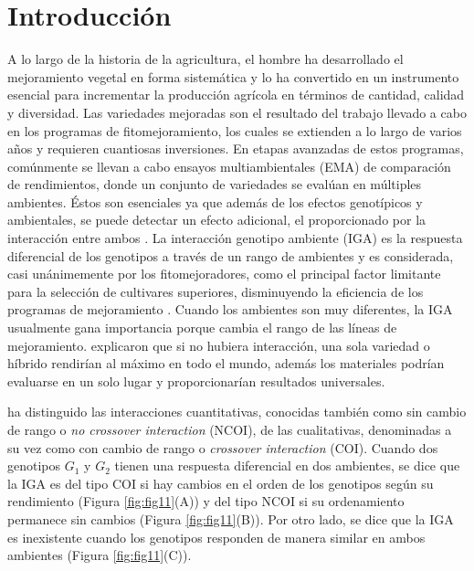 \chapter{Introducción}

A lo largo de la historia de la agricultura, el hombre ha desarrollado el mejoramiento vegetal en forma sistemática y lo ha convertido en un instrumento esencial para incrementar la producción agrícola en términos de cantidad, calidad y diversidad. Las variedades mejoradas son el resultado del trabajo llevado a cabo en los programas de fitomejoramiento, los cuales se extienden a lo largo de varios años y requieren cuantiosas inversiones. En etapas avanzadas de estos programas, comúnmente se llevan a cabo ensayos multiambientales (EMA) de comparación de rendimientos, donde un conjunto de variedades se evalúan en múltiples ambientes. Éstos son esenciales ya que además de los efectos genotípicos y ambientales, se puede detectar un efecto adicional, el proporcionado por la interacción entre ambos \citep{CruzRegazzi1997}. La interacción genotipo ambiente (IGA) es la respuesta diferencial de los genotipos a través de un rango de ambientes y es considerada, casi unánimemente por los fitomejoradores, como el principal factor limitante para la selección de cultivares superiores, disminuyendo la eficiencia de los programas de mejoramiento \citep{Crossaetal1990, CruzMedina1992, KangMagari1996}. Cuando los ambientes son muy diferentes, la IGA usualmente gana importancia porque cambia el rango de las líneas de mejoramiento. \citet{GauchZobel1997} explicaron que si no hubiera interacción, una sola variedad o híbrido rendirían al máximo en todo el mundo, además los materiales podrían evaluarse en un solo lugar y proporcionarían resultados universales.

\citet{Peto1982} ha distinguido las interacciones cuantitativas, conocidas también como sin cambio de rango o \emph{no crossover interaction} (NCOI), de las cualitativas, denominadas a su vez como con cambio de rango o \emph{crossover interaction} (COI). Cuando dos genotipos $G_1$ y $G_2$ tienen una respuesta diferencial en dos ambientes, se dice que la IGA es del tipo COI si hay cambios en el orden de los genotipos según su rendimiento (Figura \ref{fig:fig11}(A)) y del tipo NCOI si su ordenamiento permanece sin cambios (Figura  \ref{fig:fig11}(B)). Por otro lado, se dice que la IGA es inexistente cuando los genotipos responden de manera similar en ambos ambientes (Figura \ref{fig:fig11}(C)). 


